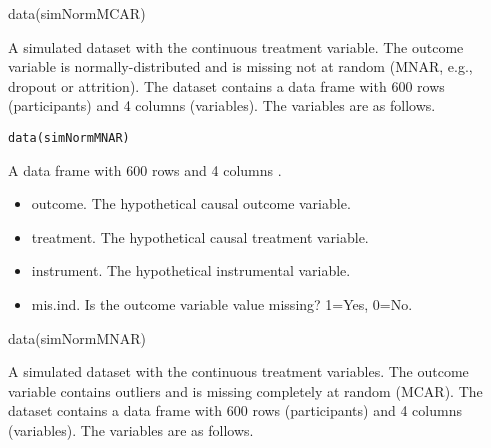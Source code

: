 \documentclass[a4paper]{book}
\begin{document}
%
\begin{Examples}
\begin{ExampleCode}

data(simNormMCAR)


\end{ExampleCode}
\end{Examples}
%
\begin{Description}\relax
A simulated dataset with the continuous treatment variable. The outcome variable
is normally-distributed and is missing not at random (MNAR, e.g., dropout or attrition).
The dataset contains a data frame with 600 rows (participants) and 4 columns (variables).
The variables are as follows.
\end{Description}
%
\begin{Usage}
\begin{verbatim}
data(simNormMNAR)
\end{verbatim}
\end{Usage}
%
\begin{Format}
A data frame with 600 rows and 4 columns .
\end{Format}
%
\begin{Details}\relax
\begin{itemize}

\item outcome. The hypothetical causal outcome variable.
\item treatment. The hypothetical causal treatment variable.
\item instrument. The hypothetical instrumental variable.
\item mis.ind. Is the outcome variable value missing? 1=Yes, 0=No.

\end{itemize}

\end{Details}
%
\begin{Examples}
\begin{ExampleCode}

data(simNormMNAR)


\end{ExampleCode}
\end{Examples}
%
\begin{Description}\relax
A simulated dataset with the continuous treatment variables. The outcome variable contains
outliers and is missing completely at random (MCAR).
The dataset contains a data frame with 600 rows (participants) and 4 columns (variables).
The variables are as follows.
\end{Description}
\end{document}

